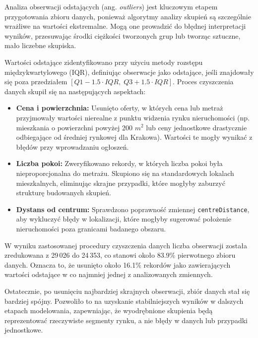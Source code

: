 \documentclass{report}
\begin{document}
Analiza obserwacji odstających (ang. \textit{outliers}) jest kluczowym etapem przygotowania zbioru danych, ponieważ algorytmy analizy skupień są szczególnie wrażliwe na wartości ekstremalne. Mogą one prowadzić do błędnej interpretacji wyników, przesuwając środki ciężkości tworzonych grup lub tworząc sztuczne, mało liczebne skupiska.

Wartości odstające zidentyfikowano przy użyciu metody rozstępu międzykwartylowego (IQR), definiując obserwacje jako odstające, jeśli znajdowały się poza przedziałem \([Q1 - 1.5 \cdot IQR,\; Q3 + 1.5 \cdot IQR]\). Proces czyszczenia danych skupił się na następujących aspektach:

\begin{itemize}
    \item \textbf{Cena i powierzchnia:} Usunięto oferty, w których cena lub metraż przyjmowały wartości nierealne z punktu widzenia rynku nieruchomości (np. mieszkania o powierzchni powyżej 200 $m^2$ lub ceny jednostkowe drastycznie odbiegające od średniej rynkowej dla Krakowa). Wartości te mogły wynikać z błędów przy wprowadzaniu ogłoszeń.
    \item \textbf{Liczba pokoi:} Zweryfikowano rekordy, w których liczba pokoi była nieproporcjonalna do metrażu. Skupiono się na standardowych lokalach mieszkalnych, eliminując skrajne przypadki, które mogłyby zaburzyć strukturę budowanych skupień.
    \item \textbf{Dystans od centrum:} Sprawdzono poprawność zmiennej \texttt{centreDistance}, aby wykluczyć błędy w lokalizacji, które mogłyby sugerować położenie nieruchomości poza granicami badanego obszaru.
\end{itemize}
W wyniku zastosowanej procedury czyszczenia danych liczba obserwacji została zredukowana z 29\,026 do 24\,353, co stanowi około 83.9\% pierwotnego zbioru danych. Oznacza to, że usunięto około 16.1\% rekordów jako zawierających wartości odstające w co najmniej jednej z analizowanych zmiennych.

Ostatecznie, po usunięciu najbardziej skrajnych obserwacji, zbiór danych stał się bardziej spójny. Pozwoliło to na uzyskanie stabilniejszych wyników w dalszych etapach modelowania, zapewniając, że wyodrębnione skupienia będą reprezentować rzeczywiste segmenty rynku, a nie błędy w danych lub przypadki jednostkowe.
\end{document}
